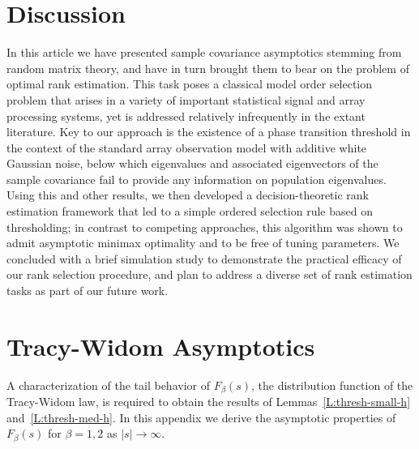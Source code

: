 \documentclass[final]{IEEEtran} %
\begin{document}
\section{Discussion}
\label{s:summ}

In this article we have presented sample covariance asymptotics stemming from random matrix theory, and have in turn brought them to bear on the problem of optimal rank estimation.  This task poses a classical model order selection problem that arises in a variety of important statistical signal and array processing systems, yet is addressed relatively infrequently in the extant literature.  Key to our approach is the existence of a phase transition threshold in the context of the standard array observation model with additive white Gaussian noise, below which eigenvalues and associated eigenvectors of the sample covariance fail to provide any information on population eigenvalues.  Using this and other results, we then developed a decision-theoretic rank estimation framework that led to a simple ordered selection rule based on thresholding; in contrast to competing approaches, this algorithm was shown to admit asymptotic minimax optimality and to be free of tuning parameters.  We concluded with a brief simulation study to demonstrate the practical efficacy of our rank selection procedure, and plan to address a diverse set of rank estimation tasks as part of our future work.

\appendices

\section{Tracy-Widom Asymptotics}\label{S:tw-asymp}

A characterization of the tail behavior of $F_\beta(s)$, the distribution function of the Tracy-Widom law, is required to obtain the results of Lemmas~\ref{L:thresh-small-h} and~\ref{L:thresh-med-h}.  In this appendix we derive the asymptotic properties of $F_\beta(s)$ for $\beta=1,2$ as
$|s| \to \infty$.
\end{document}
